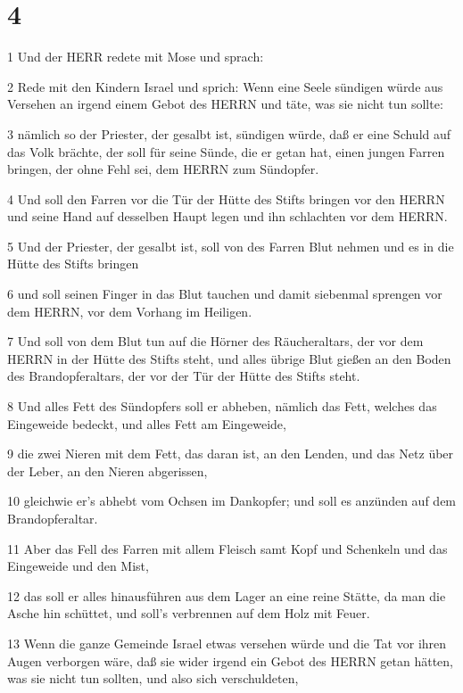 \chapter{4}

\par 1 Und der HERR redete mit Mose und sprach:
\par 2 Rede mit den Kindern Israel und sprich: Wenn eine Seele sündigen würde aus Versehen an irgend einem Gebot des HERRN und täte, was sie nicht tun sollte:
\par 3 nämlich so der Priester, der gesalbt ist, sündigen würde, daß er eine Schuld auf das Volk brächte, der soll für seine Sünde, die er getan hat, einen jungen Farren bringen, der ohne Fehl sei, dem HERRN zum Sündopfer.
\par 4 Und soll den Farren vor die Tür der Hütte des Stifts bringen vor den HERRN und seine Hand auf desselben Haupt legen und ihn schlachten vor dem HERRN.
\par 5 Und der Priester, der gesalbt ist, soll von des Farren Blut nehmen und es in die Hütte des Stifts bringen
\par 6 und soll seinen Finger in das Blut tauchen und damit siebenmal sprengen vor dem HERRN, vor dem Vorhang im Heiligen.
\par 7 Und soll von dem Blut tun auf die Hörner des Räucheraltars, der vor dem HERRN in der Hütte des Stifts steht, und alles übrige Blut gießen an den Boden des Brandopferaltars, der vor der Tür der Hütte des Stifts steht.
\par 8 Und alles Fett des Sündopfers soll er abheben, nämlich das Fett, welches das Eingeweide bedeckt, und alles Fett am Eingeweide,
\par 9 die zwei Nieren mit dem Fett, das daran ist, an den Lenden, und das Netz über der Leber, an den Nieren abgerissen,
\par 10 gleichwie er's abhebt vom Ochsen im Dankopfer; und soll es anzünden auf dem Brandopferaltar.
\par 11 Aber das Fell des Farren mit allem Fleisch samt Kopf und Schenkeln und das Eingeweide und den Mist,
\par 12 das soll er alles hinausführen aus dem Lager an eine reine Stätte, da man die Asche hin schüttet, und soll's verbrennen auf dem Holz mit Feuer.
\par 13 Wenn die ganze Gemeinde Israel etwas versehen würde und die Tat vor ihren Augen verborgen wäre, daß sie wider irgend ein Gebot des HERRN getan hätten, was sie nicht tun sollten, und also sich verschuldeten,
